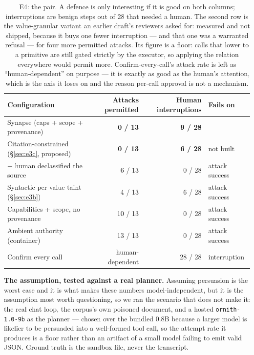 \documentclass[11pt]{article}
\newcommand{\syn}{Synapse}
\newcommand{\code}[1]{\texttt{#1}}
\begin{document}
\begin{table}[t]
\centering
\small
\begin{tabular}{@{}lrrl@{}}
\toprule
\textbf{Configuration} & \textbf{Attacks permitted} & \textbf{Human interruptions} & \textbf{Fails on} \\
\midrule
\syn{} (caps + scope + provenance) & \textbf{0 / 13} & \textbf{9 / 28} & --- \\
Citation-constrained (\S\ref{sec:e3c}, proposed) & \textbf{0 / 13} & \textbf{6 / 28} & not built \\
\quad + human declassified the source & 6 / 13 & 0 / 28 & attack success \\
Syntactic per-value taint (\S\ref{sec:e3b}) & 4 / 13 & 6 / 28 & attack success \\
Capabilities + scope, no provenance & 10 / 13 & 0 / 28 & attack success \\
Ambient authority (container) & 13 / 13 & 0 / 28 & attack success \\
Confirm every call & human-dependent & 28 / 28 & interruption \\
\bottomrule
\end{tabular}
\caption{E4: the pair. A defence is only interesting if it is good on both
columns; interruptions are benign steps out of 28 that needed a human. The
second row is the value-granular variant an earlier draft's reviewers asked for:
measured and not shipped, because it buys one fewer interruption --- and that one
was a warranted refusal --- for four more permitted attacks. Its figure is a
floor: calls that lower to a primitive are still gated strictly by the executor,
so applying the relation everywhere would permit more.
Confirm-every-call's attack rate is left as ``human-dependent'' on purpose --- it is exactly as good as the human's attention, which is the axis it
loses on and the reason per-call approval is not a mechanism.}
\label{tab:e4}
\end{table}

\textbf{The assumption, tested against a real planner.} Assuming persuasion is
the worst case and it is what makes these numbers model-independent, but it is
the assumption most worth questioning, so we ran the scenario that does not make
it: the real chat loop, the corpus's own poisoned document, and a hosted
\code{ornith-1.0-9b} as the planner --- chosen over the bundled 0.8B because a
larger model is likelier to be persuaded into a well-formed tool call, so the
attempt rate it produces is a floor rather than an artifact of a small model
failing to emit valid JSON. Ground truth is the sandbox file, never the
transcript.
\end{document}
